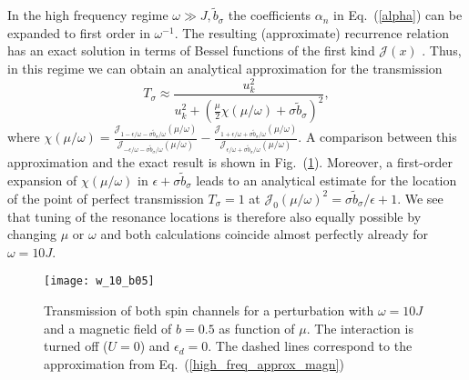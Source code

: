 \documentclass[aps,twocolumn,showpacs,floatfix,prl]{revtex4}
\newcommand{\be}{\begin{equation}}
\newcommand{\ee}{\end{equation}}
\begin{document}
In the high frequency regime $\omega \gg J, \tilde{b}_{\sigma}$ the coefficients $\alpha_n$ in Eq.~(\ref{alpha}) can be expanded to first order in $\omega^{-1}$. The resulting (approximate) recurrence relation has an exact solution in terms of Bessel functions of the first kind $\mathcal{J}(x)$ \cite{thuberg2016quantum,della2007visualization}. Thus, in this regime we can obtain an analytical approximation for the transmission
\be
T_{\sigma} \approx \frac{u_k^2}{u_k^2+ \left(\frac{\mu}{2}\chi(\mu/\omega)+ \sigma\tilde{b}_{\sigma}\right)^2} \label{high_freq_approx_magn},
\ee
where $\chi(\mu/\omega)=\frac{\mathcal{J}_{1 - \epsilon/\omega-\sigma\tilde{b}_{\sigma}/\omega}(\mu/\omega)}{\mathcal{J}_{-\epsilon/\omega-\sigma\tilde{b}_{\sigma}/\omega}(\mu/\omega)} - \frac{\mathcal{J}_{1 + \epsilon/\omega+
\sigma\tilde{b}_{\sigma}/\omega}(\mu/\omega)}{\mathcal{J}_{\epsilon/\omega+ \sigma\tilde{b}_{\sigma}/\omega}(\mu/\omega)}$.
A comparison between this approximation and the exact result is shown in Fig.~(\ref{w_05_mu_3_b_025_U0}). Moreover, a first-order expansion of $\chi(\mu/\omega)$ in $\epsilon + \sigma\tilde{b}_{\sigma}$ leads to an analytical estimate for the location
of the point of perfect transmission $T_{\sigma} = 1$ at $\mathcal{J}_{0}(\mu/\omega)^2 = \sigma\tilde{b}_{\sigma}/\epsilon + 1$.
We see that tuning of the resonance locations is therefore also equally possible by changing $\mu$ or $\omega$ and
both calculations coincide almost perfectly already for $\omega = 10J$. 
\begin{figure}[t]
\texttt{[image: w\_10\_b05]}
 \caption{Transmission of both spin channels for a perturbation with $\omega=10J$ and a magnetic field of $b=0.5$ as function of $\mu$. The interaction is turned off ($U=0$) and $\epsilon_d=0$. The dashed lines correspond to the approximation from Eq.~(\ref{high_freq_approx_magn})}
\label{w_05_mu_3_b_025_U0}
\end{figure}
\end{document}
